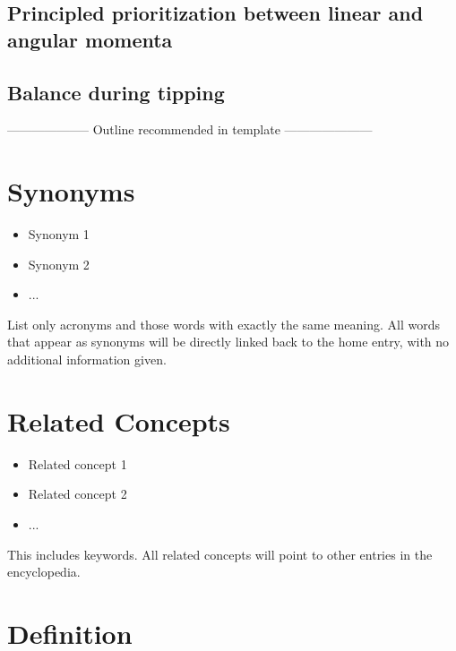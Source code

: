 \documentclass{llncs}
\begin{document}
\subsection{Principled prioritization between linear and angular momenta}


\subsection{Balance during tipping}





\newpage

-------------------- Outline recommended in template ---------------------


\section{Synonyms}
\begin{itemize}
\item{Synonym 1}
\item{Synonym 2}
\item{...}
\end{itemize}
List only acronyms and those words with exactly the same meaning. All 
words that appear as synonyms will be directly linked back to the home 
entry, with no additional information given.

\section{Related Concepts}
\begin{itemize}
\item{Related concept 1}
\item{Related concept 2}
\item{...}
\end{itemize}

This includes keywords. All related concepts will point to other entries in the encyclopedia. 


\section{Definition}
\end{document}
